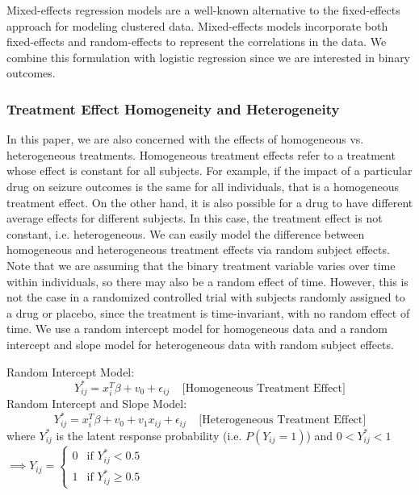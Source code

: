 \documentclass{article}
\begin{document}
    Mixed-effects regression models are a well-known alternative to the fixed-effects approach for modeling clustered data. Mixed-effects models incorporate both fixed-effects and random-effects to represent the correlations in the data. We combine this formulation with logistic regression since we are interested in binary outcomes. 
    \subsubsection{Treatment Effect Homogeneity and Heterogeneity}
    In this paper, we are also concerned with the effects of homogeneous vs. heterogeneous treatments. Homogeneous treatment effects refer to a treatment whose effect is constant for all subjects. For example, if the impact of a particular drug on seizure outcomes is the same for all individuals, that is a homogeneous treatment effect. On the other hand, it is also possible for a drug to have different average effects for different subjects. In this case, the treatment effect is not constant, i.e. heterogeneous. We can easily model the difference between homogeneous and heterogeneous treatment effects via random subject effects. Note that we are assuming that the binary treatment variable varies over time within individuals, so there may also be a random effect of time. However, this is not the case in a randomized controlled trial with subjects randomly assigned to a drug or placebo, since the treatment is time-invariant, with no random effect of time. We use a random intercept model for homogeneous data and a random intercept and slope model for heterogeneous data with random subject effects. 

    \noindent Random Intercept Model:
    \begin{equation}
        Y_{ij}^* = x_i^T\beta + v_0 + \epsilon_{ij} \;\;\;\; \text{[Homogeneous Treatment Effect]}
    \end{equation}
    Random Intercept and Slope Model:
    \begin{equation}
        Y_{ij}^* = x_i^T\beta + v_0 + v_1x_{ij} + \epsilon_{ij} \;\;\;\; \text{[Heterogeneous Treatment Effect]}
    \end{equation} 
    where $Y_{ij}^*$ is the latent response probability (i.e. $P(Y_{ij} = 1)$) and $ 0 < Y_{ij}^* < 1$   $\implies Y_{ij} = 
                    \begin{cases}
                        0 & \text{if } Y_{ij }^* < 0.5\\    
                        1 & \text{if } Y_{ij }^* \ge 0.5    
                    \end{cases}$ 
\end{document}
